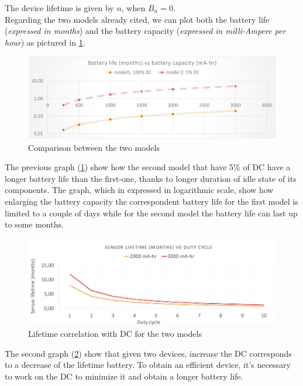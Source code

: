 \documentclass[10pt,a4paper]{report}
\theoremstyle{definition}
\begin{document}
The device lifetime is given by $n$, when $B_{n} = 0$.\\
Regarding the two models already cited, we can plot both the battery life (\textit{expressed in months}) and the battery capacity (\textit{expressed in milli-Ampere per hour}) as pictured in \ref{battery-vs-capacity}.
\begin{figure}[h]
	\centering\includegraphics[scale=0.30]{images/Pasted image 20230327151650.png}
	\caption{Comparison between the two models}
	\label{battery-vs-capacity}
\end{figure}

The previous graph (\ref{battery-vs-capacity}) show how the second model that have 5\% of DC have a longer battery life than the first-one, thanks to longer duration of idle state of its components. The graph, which in expressed in logarithmic scale, show how enlarging the battery capacity the correspondent battery life for the first model is limited to a couple of days while for the second model the battery life can last up to some months.
\begin{figure}[h!]
	\centering\includegraphics[scale=0.25]{images/Pasted image 20230327151825.png}
	\caption{Lifetime correlation with DC for the two models}
\label{lifetime-vs-dc}
\end{figure}

The second graph (\ref{lifetime-vs-dc}) show that given two devices, increase the DC corresponds to a decrease of the lifetime battery. To obtain an efficient device, it's necessary to work on the DC to minimize it and obtain a longer battery life.
\end{document}
